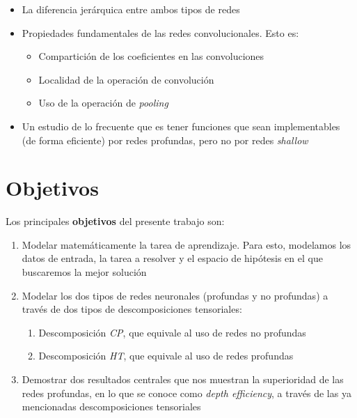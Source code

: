 \begin{itemize}
    \item La diferencia jerárquica entre ambos tipos de redes
    \item Propiedades fundamentales de las redes convolucionales. Esto es:
        \begin{itemize}
            \item Compartición de los coeficientes en las convoluciones
            \item Localidad de la operación de convolución
            \item Uso de la operación de \textit{pooling}
        \end{itemize}
    \item Un estudio de lo frecuente que es tener funciones que sean implementables (de forma eficiente) por redes profundas, pero no por redes \textit{shallow}
\end{itemize}

\section{Objetivos}

Los principales \textbf{objetivos} del presente trabajo son:

\begin{enumerate}
    \item Modelar matemáticamente la tarea de aprendizaje. Para esto, modelamos los datos de entrada, la tarea a resolver y el espacio de hipótesis en el que buscaremos la mejor solución
    \item Modelar los dos tipos de redes neuronales (profundas y no profundas) a través de dos tipos de descomposiciones tensoriales:
        \begin{enumerate}
            \item Descomposición \textit{CP}, que equivale al uso de redes no profundas
            \item Descomposición \textit{HT}, que equivale al uso de redes profundas
        \end{enumerate}
    \item Demostrar dos resultados centrales que nos muestran la superioridad de las redes profundas, en lo que se conoce como \textit{depth efficiency}, a través de las ya mencionadas descomposiciones tensoriales
\end{enumerate}

